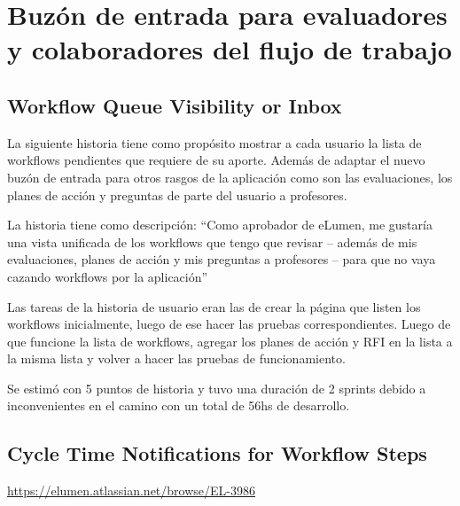 \section{Buzón de entrada para evaluadores y colaboradores del flujo de trabajo}
\subsection{Workflow Queue Visibility or Inbox}
La siguiente historia tiene como propósito mostrar a cada usuario la lista de workflows pendientes que requiere de su aporte. Además de adaptar el nuevo buzón de entrada para otros rasgos de la aplicación como son las evaluaciones, los planes de acción y preguntas de parte del usuario a profesores.

La historia tiene como descripción: “Como aprobador de eLumen, me gustaría una vista unificada de los workflows que tengo que revisar – además de mis evaluaciones, planes de acción y mis preguntas a profesores – para que no vaya cazando workflows por la aplicación”

Las tareas de la historia de usuario eran las de crear la página que listen los workflows inicialmente, luego de ese hacer las pruebas correspondientes. Luego de que funcione la lista de workflows, agregar los planes de acción y RFI en la lista a la misma lista y volver a hacer las pruebas de funcionamiento. 

Se estimó con 5 puntos de historia y tuvo una duración de 2 sprints debido a inconvenientes en el camino con un total de 56hs de desarrollo.

\subsection{Cycle Time Notifications for Workflow Steps}
\url{https://elumen.atlassian.net/browse/EL-3986}